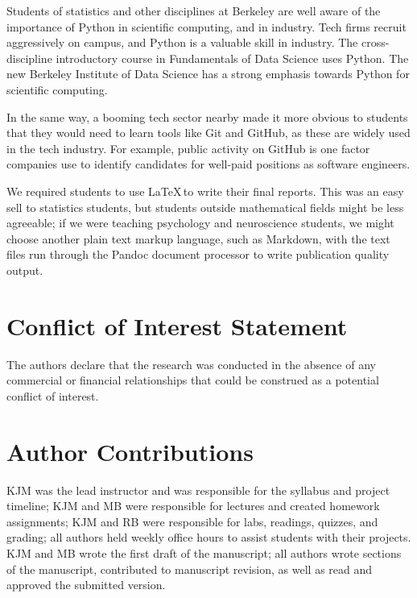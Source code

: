 
Students of statistics and other disciplines at Berkeley are well aware of the
importance of Python in scientific computing, and in industry.  Tech firms
recruit aggressively on campus, and Python is a valuable skill in industry.
The cross-discipline introductory course in Fundamentals of Data Science uses
Python. The new Berkeley Institute of Data Science has a strong emphasis
towards Python for scientific computing.

In the same way, a booming tech sector nearby made it more obvious to students
that they would need to learn tools like Git and GitHub, as these are widely
used in the tech industry.  For example, public activity on GitHub is one
factor companies use to identify candidates for well-paid positions as
software engineers.

We required students to use \LaTeX\,to write their final reports.  This was an
easy sell to statistics students, but students outside mathematical fields
might be less agreeable; if we were teaching psychology and neuroscience
students, we might choose another plain text markup language, such as
Markdown, with the text files run through the Pandoc document processor to
write publication quality output.


\section*{Conflict of Interest Statement}

The authors declare that the research was conducted in the absence of any
commercial or financial relationships that could be construed as a potential
conflict of interest.

\section*{Author Contributions}

KJM was the lead instructor and was responsible for the syllabus and project timeline;
KJM and MB were responsible for lectures and created homework assignments;
KJM and RB were responsible for labs, readings, quizzes, and grading;
all authors held weekly office hours to assist students with their projects.
KJM and MB wrote the first draft of the manuscript;
all authors wrote sections of the manuscript, contributed to manuscript revision, 
as well as read and approved the submitted version.

